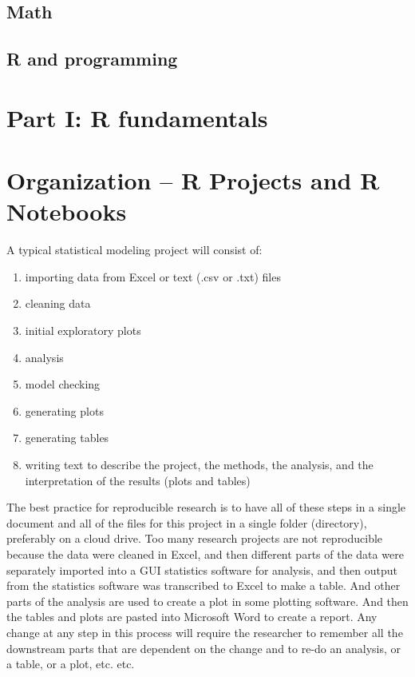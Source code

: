 \documentclass[]{book}
\providecommand{\tightlist}{%
  \setlength{\itemsep}{0pt}\setlength{\parskip}{0pt}}
\begin{document}
\hypertarget{math}{%
\section{Math}\label{math}}

\hypertarget{r-and-programming}{%
\section{R and programming}\label{r-and-programming}}

\hypertarget{part-i-r-fundamentals}{%
\chapter*{Part I: R fundamentals}\label{part-i-r-fundamentals}}

\hypertarget{organization-r-projects-and-r-notebooks}{%
\chapter{Organization -- R Projects and R Notebooks}\label{organization-r-projects-and-r-notebooks}}

A typical statistical modeling project will consist of:

\begin{enumerate}
\def\labelenumi{\arabic{enumi}.}
\tightlist
\item
  importing data from Excel or text (.csv or .txt) files
\item
  cleaning data
\item
  initial exploratory plots
\item
  analysis
\item
  model checking
\item
  generating plots
\item
  generating tables
\item
  writing text to describe the project, the methods, the analysis, and the interpretation of the results (plots and tables)
\end{enumerate}

The best practice for reproducible research is to have all of these steps in a single document and all of the files for this project in a single folder (directory), preferably on a cloud drive. Too many research projects are not reproducible because the data were cleaned in Excel, and then different parts of the data were separately imported into a GUI statistics software for analysis, and then output from the statistics software was transcribed to Excel to make a table. And other parts of the analysis are used to create a plot in some plotting software. And then the tables and plots are pasted into Microsoft Word to create a report. Any change at any step in this process will require the researcher to remember all the downstream parts that are dependent on the change and to re-do an analysis, or a table, or a plot, etc. etc.
\end{document}

